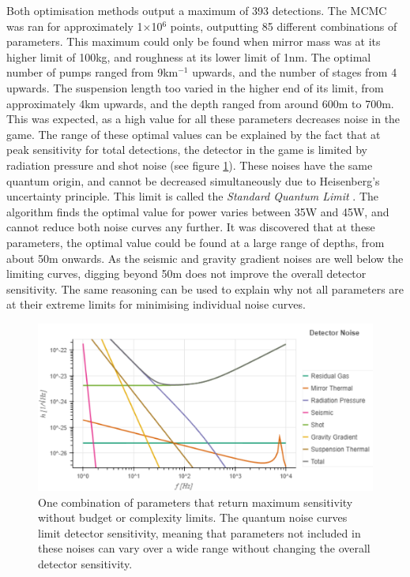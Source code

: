 \documentclass{article}
\begin{document}
Both optimisation methods output a maximum of 393 detections. The MCMC
was ran for approximately 1$\times$10$^6$ points, outputting 85
different combinations of parameters. This maximum could only be found
when mirror mass was at its higher limit of 100kg, and roughness at
its lower limit of 1nm. The optimal number of pumps ranged from
9km$^{-1}$ upwards, and the number of stages from 4 upwards. The
suspension length too varied in the higher end of its limit, from
approximately 4km upwards, and the depth ranged from around 600m to
700m. This was expected, as a high value for all these parameters
decreases noise in the game. The range of these optimal values can be
explained by the fact that at peak sensitivity for total detections,
the detector in the game is limited by radiation pressure and shot
noise (see figure \ref{fig::SPQMaxNoLim}). These noises have the same
quantum origin, and cannot be decreased simultaneously due to
Heisenberg's uncertainty principle. This limit is called the
\textit{Standard Quantum Limit} \cite{danilishin}. The algorithm finds
the optimal value for power varies between 35W and 45W, and cannot
reduce both noise curves any further. It was discovered that at these
parameters, the optimal value could be found at a large range of
depths, from about 50m onwards. As the seismic and gravity gradient
noises are well below the limiting curves, digging beyond 50m does not
improve the overall detector sensitivity. The same reasoning can be
used to explain why not all parameters are at their extreme limits for
minimising individual noise curves. 

\begin{figure}[h!]
    \centering
    \includegraphics[scale=0.55]{SPQMaxNoLim.pdf}
    \captionsetup{width=0.9\textwidth}
    \caption{One combination of parameters that return maximum
      sensitivity without budget or complexity limits. The quantum
      noise curves limit detector sensitivity, meaning that parameters
      not included in these noises can vary over a wide range without
      changing the overall detector sensitivity.}
    \label{fig::SPQMaxNoLim}
\end{figure}
\end{document}
